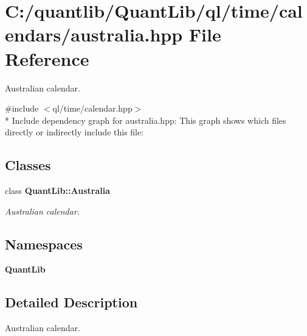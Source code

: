 \section{C\+:/quantlib/\+Quant\+Lib/ql/time/calendars/australia.hpp File Reference}
\label{australia_8hpp}


Australian calendar.  


{\ttfamily \#include $<$ql/time/calendar.\+hpp$>$}\\*
Include dependency graph for australia.\+hpp\+:
This graph shows which files directly or indirectly include this file\+:
\subsection*{Classes}
\begin{DoxyCompactItemize}
\item 
class {\bf Quant\+Lib\+::\+Australia}
\begin{DoxyCompactList}\small\item\em Australian calendar. \end{DoxyCompactList}\end{DoxyCompactItemize}
\subsection*{Namespaces}
\begin{DoxyCompactItemize}
\item 
 {\bf Quant\+Lib}
\end{DoxyCompactItemize}


\subsection{Detailed Description}
Australian calendar. 

